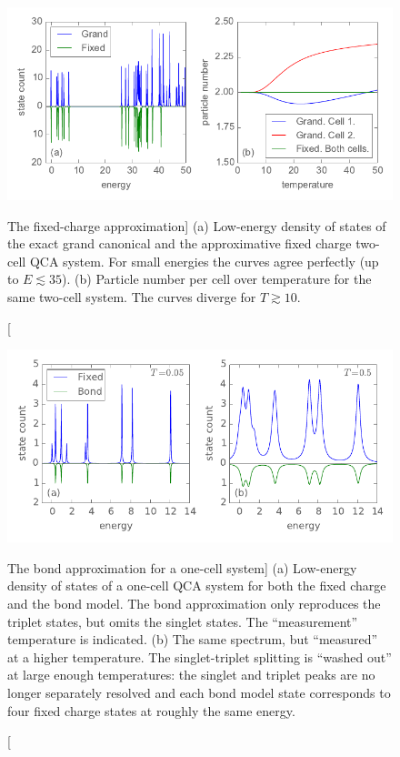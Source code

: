 %
\begin{figure}
  \center
  \includegraphics{fixed_charge_approximation}
  \caption
  [The fixed-charge approximation]
  {
  (a) Low-energy density of states of the exact grand canonical and the
  approximative fixed charge two-cell QCA system. For small energies the curves
  agree perfectly (up to $E \lesssim 35$). (b) Particle number per cell over
  temperature for the same two-cell system. The curves diverge for $T \gtrsim
  10$.
  }
  \label{fig:fixed_charge_approximation}
\end{figure}
%
%
\begin{figure}
  \center
  \includegraphics{bond_approximation1}
  \caption
  [The bond approximation for a one-cell system]
  {
  (a) Low-energy density of states of a one-cell QCA system for both the fixed
  charge and the bond model. The bond approximation only reproduces the triplet
  states, but omits the singlet states. The ``measurement'' temperature is
  indicated. (b) The same spectrum, but ``measured'' at a higher temperature.
  The singlet-triplet splitting is ``washed out'' at large enough temperatures:
  the singlet and triplet peaks are no longer separately resolved and each bond
  model state corresponds to four fixed charge states at roughly the same
  energy.
  }
  \label{fig:bond_approximation1}
\end{figure}
